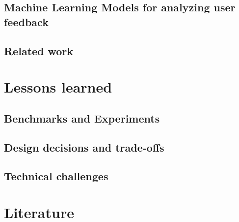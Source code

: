 \documentclass[
        a4paper,     %
        titlepage,   %
        twoside,     %
        parskip      %
        ]{scrartcl}  %
\begin{document}
    \subsection{Machine Learning Models for analyzing user feedback}
    \subsection{Related work}
    \pagebreak

  \section{Lessons learned}
    \subsection{Benchmarks and Experiments}
    \subsection{Design decisions and trade-offs}
    \subsection{Technical challenges}
    \pagebreak

  \section{Literature}

  \clearpage
  
\end{document}
